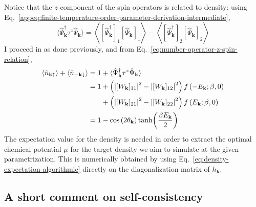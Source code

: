 Notice that the $z$ component of the spin operators is related to density: using Eq.~\eqref{appeq:finite-temperature-order-parameter-derivation-intermediate},
\[
	\langle
		\hat\Psi_\mathbf{k}^\dagger \tau^z \hat\Psi_\mathbf{k}
	\rangle = \left\langle 
		[\hat \Psi_\mathbf{k}^\dagger]_1 [\hat \Psi_\mathbf{k}]_1 
	\right\rangle - \left\langle 
		[\hat \Psi_\mathbf{k}^\dagger]_2 [\hat \Psi_\mathbf{k}]_2
	\right\rangle
\]
I proceed in as done previously, and from Eq.~\eqref{eq:number-operator-z-spin-relation},
\begin{align}
	\langle \hat n_{\mathbf{k}\uparrow} \rangle + \langle \hat 	n_{-\mathbf{k}\downarrow} \rangle = 1 &+ \langle \hat\Psi_\mathbf{k}^\dagger \tau^z \hat\Psi_\mathbf{k} \rangle \nonumber \\
	= 1 &+ \left(
		\abs{[W_\mathbf{k}]_{11}}^2 - \abs{[W_\mathbf{k}]_{12}}^2
	\right) f\left( -E_\mathbf{k}; \beta,0 \right) \nonumber \\
	&+ \left(
		\abs{[W_\mathbf{k}]_{21}}^2 - \abs{[W_\mathbf{k}]_{22}}^2
	\right) f\left( E_\mathbf{k}; \beta,0 \right) \label{eq:density-expectation-algorithmic} \\
	= 1 &- \cos \left(
		2 \theta_\mathbf{k}
	\right) \tanh(\frac{\beta E_\mathbf{k}}{2}) \label{eq:density-expectation-theoretical} 
\end{align}
The expectation value for the density is needed in order to extract the optimal chemical potential $\mu$ for the target density we aim to simulate at the given parametrization. This is numerically obtained by using Eq.~\eqref{eq:density-expectation-algorithmic} directly on the diagonalization matrix of $h_\mathbf{k}$.

\subsection{A short comment on self-consistency}\label{subsec:mft-self-consitency-cooper-decomposition}

